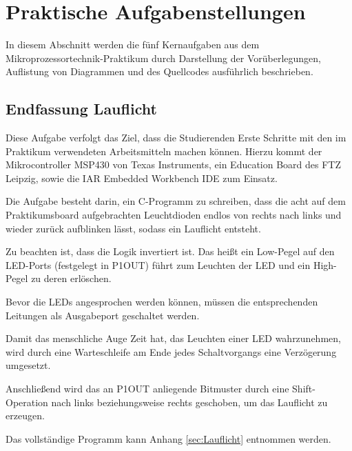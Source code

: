 \documentclass[12pt,a4paper,bibliography=totocnumbered,listof=totocnumbered]{scrartcl}
\begin{document}
\section{Praktische Aufgabenstellungen}

In diesem Abschnitt werden die fünf Kernaufgaben aus dem Mikroprozessortechnik-Praktikum durch Darstellung der Vorüberlegungen, Auflistung von Diagrammen und des Quellcodes ausführlich beschrieben.

\subsection{Endfassung Lauflicht}
Diese Aufgabe verfolgt das Ziel, dass die Studierenden Erste Schritte mit den im Praktikum verwendeten Arbeitsmitteln machen können.
Hierzu kommt der Mikrocontroller MSP430 von Texas Instruments, ein Education Board des FTZ Leipzig, sowie die IAR Embedded Workbench IDE zum Einsatz.

Die Aufgabe besteht darin, ein C-Programm zu schreiben, dass die acht auf dem Praktikumsboard aufgebrachten Leuchtdioden endlos von rechts nach links und wieder zurück aufblinken lässt, sodass ein Lauflicht entsteht.

Zu beachten ist, dass die Logik invertiert ist. Das heißt ein Low-Pegel auf den LED-Ports (festgelegt in P1OUT) führt zum Leuchten der LED und ein High-Pegel zu deren erlöschen.

Bevor die LEDs angesprochen werden können, müssen die entsprechenden Leitungen als Ausgabeport geschaltet werden.

\vspace{1em}


Damit das menschliche Auge Zeit hat, das Leuchten einer LED wahrzunehmen, wird durch eine Warteschleife am Ende jedes Schaltvorgangs eine Verzögerung umgesetzt.

\vspace{1em}


Anschließend wird das an P1OUT anliegende Bitmuster durch eine Shift-Operation nach links beziehungsweise rechts geschoben, um das Lauflicht zu erzeugen.

\vspace{1em}


Das vollständige Programm kann Anhang \ref{sec:Lauflicht} entnommen werden.
\end{document}
